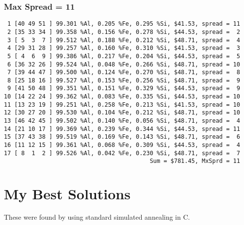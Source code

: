 \documentclass{article}
\begin{document}
\subsubsection{Max Spread = 11}
\begin{verbatim}
 1 [40 49 51 ] 99.301 %Al, 0.205 %Fe, 0.295 %Si, $41.53, spread = 11
 2 [35 33 34 ] 99.358 %Al, 0.156 %Fe, 0.278 %Si, $44.53, spread =  2
 3 [ 5  3  7 ] 99.512 %Al, 0.188 %Fe, 0.212 %Si, $48.71, spread =  4
 4 [29 31 28 ] 99.257 %Al, 0.160 %Fe, 0.310 %Si, $41.53, spread =  3
 5 [ 4  6  9 ] 99.386 %Al, 0.217 %Fe, 0.204 %Si, $44.53, spread =  5
 6 [36 32 26 ] 99.524 %Al, 0.048 %Fe, 0.266 %Si, $48.71, spread = 10
 7 [39 44 47 ] 99.500 %Al, 0.124 %Fe, 0.270 %Si, $48.71, spread =  8
 8 [25 18 16 ] 99.527 %Al, 0.153 %Fe, 0.256 %Si, $48.71, spread =  9
 9 [41 50 48 ] 99.351 %Al, 0.151 %Fe, 0.329 %Si, $44.53, spread =  9
10 [14 22 24 ] 99.362 %Al, 0.083 %Fe, 0.335 %Si, $44.53, spread = 10
11 [13 23 19 ] 99.251 %Al, 0.258 %Fe, 0.213 %Si, $41.53, spread = 10
12 [30 27 20 ] 99.530 %Al, 0.104 %Fe, 0.212 %Si, $48.71, spread = 10
13 [46 42 45 ] 99.502 %Al, 0.140 %Fe, 0.056 %Si, $48.71, spread =  4
14 [21 10 17 ] 99.369 %Al, 0.239 %Fe, 0.344 %Si, $44.53, spread = 11
15 [37 43 38 ] 99.519 %Al, 0.169 %Fe, 0.143 %Si, $48.71, spread =  6
16 [11 12 15 ] 99.361 %Al, 0.068 %Fe, 0.309 %Si, $44.53, spread =  4
17 [ 8  1  2 ] 99.526 %Al, 0.042 %Fe, 0.230 %Si, $48.71, spread =  7
                                          Sum = $781.45, MxSprd = 11
\end{verbatim}


\section{My Best Solutions}
These were found by using standard simulated annealing in C.
\end{document}
